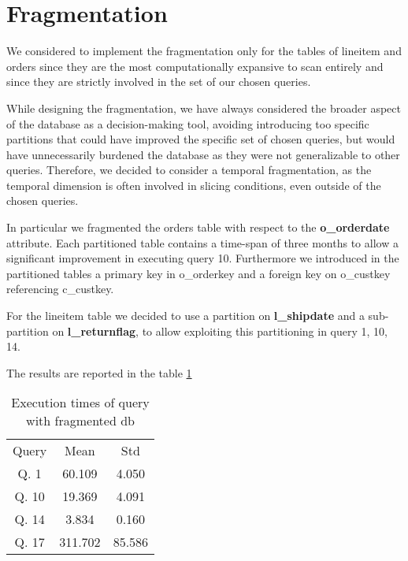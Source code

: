 \section{Fragmentation}
We considered to implement the fragmentation only for the tables of lineitem and orders since they are the most computationally expansive to scan entirely and since they are strictly involved in the set of our chosen queries.

While designing the fragmentation, we have always considered the broader aspect of the database as a decision-making tool, avoiding introducing too specific partitions that could have improved the specific set of chosen queries, but would have unnecessarily burdened the database as they were not generalizable to other queries. Therefore, we decided to consider a temporal fragmentation, as the temporal dimension is often involved in slicing conditions, even outside of the chosen queries. 

In particular we fragmented the orders table with respect to the \textbf{o\_orderdate} attribute. Each partitioned table contains a time-span of three months to allow a significant improvement in executing query 10. Furthermore we introduced in the partitioned tables a primary key in o\_orderkey and a foreign key on o\_custkey referencing c\_custkey.

For the lineitem table we decided to use a partition on \textbf{l\_shipdate} and a sub-partition on \textbf{l\_returnflag}, to allow exploiting this partitioning in query 1, 10, 14.

The results are reported in the table \ref{tab:fragm_exec_time}

\begin{table}[H]
\centering 
\begin{tabular}{c|c|c} 
\rowcolor{blue!50} Query & Mean & Std\\
\rowcolor{gray!10} Q. 1 &60.109 &4.050\\
\rowcolor{white} Q. 10 &19.369 &4.091\\
\rowcolor{gray!10} Q. 14 &3.834 &0.160\\
\rowcolor{white} Q. 17 &311.702 &85.586\\
\end{tabular}\\[0.5cm] 
\caption{Execution times of query with fragmented db} 
\label{tab:fragm_exec_time} 
\end{table}
